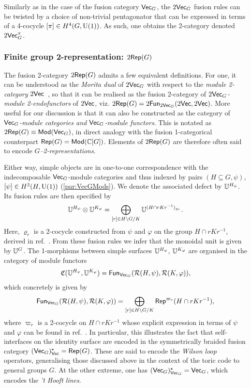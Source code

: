 Similarly as in the case of the fusion category $\mathsf{Vec}_G$, the $2\mathsf{Vec}_G$ fusion rules can be twisted by a choice of non-trivial pentagonator that can be expressed in terms of a 4-cocycle $[\pi]\in H^4(G,{\rm U}(1))$. As such, one obtains the 2-category denoted $2\mathsf{Vec}_G^\pi$.
\subsubsection{Finite group 2-representation: $2\mathsf{Rep}(G)$} The fusion 2-category $2\mathsf{Rep}(G)$ admits a few equivalent definitions. For one, it can be understood as the \emph{Morita dual} of $2\mathsf{Vec}_G$ with respect to the \emph{module 2-category} $2\mathsf{Vec}$~\cite{Delcamp2021}, so that it can be realised as the fusion 2-category of \emph{$2\mathsf{Vec}_G$-module 2-endofunctors} of $2\mathsf{Vec}$, viz. $2\mathsf{Rep}(G)=2\mathsf{Fun}_{2\mathsf{Vec}_G}(2\mathsf{Vec},2\mathsf{Vec})$. More useful for our discussion is that it can also be constructed as the category of \emph{$\mathsf{Vec}_G$-module categories and $\mathsf{Vec}_G$-module functors}. This is notated as $2\mathsf{Rep}(G)\equiv\mathsf{Mod}(\mathsf{Vec}_G)$, in direct analogy with the fusion 1-categorical counterpart $\mathsf{Rep}(G)=\mathsf{Mod}(\mathbb C[G])$. Elements of $2\mathsf{Rep}(G)$ are therefore often said to encode \emph{$G$--2-representations}.

\bigskip\noindent Either way, simple objects are in one-to-one correspondence with the indecomposable $\mathsf{Vec}_G$-module categories and thus indexed by pairs $(H\subseteq G,\psi)$, $[\psi]\in H^2(H,{\rm U}(1))$ (\cref{par:VecGMods}). We denote the associated defect by $\mathbb U^{H_\psi}$. Its fusion rules are then specified by
\begin{equation}
	\mathbb U^{H_\psi} \otimes \mathbb U^{K_\varphi} = \bigoplus_{[r]\in H\backslash G / K} \mathbb U^{(H\cap rKr^{-1})_{\varrho_r}}.
\end{equation}
Here, $\varrho_r$ is a 2-cocycle constructed from $\psi$ and $\varphi$ on the group $H\cap rKr^{-1}$, derived in ref.~\cite{Greenough2010}.  From these fusion rules we infer that the monoidal unit is given by $\mathbb U^G$. The 1-morphisms between simple surfaces $\mathbb U^{H_\psi}$, $\mathbb U^{K_\varphi}$ are organised in the category of module functors
\begin{equation}
	\mathfrak{C}(\mathbb U^{H_\psi}, \mathbb U^{K_\varphi}) = \mathsf{Fun}_{\mathsf{Vec}_G}(\mathcal{R}(H,\psi), \mathcal{R}(K,\varphi)),
\end{equation}
which concretely is given by
\begin{equation}\label{eq:2RepG1morph}
	\mathsf{Fun}_{\mathsf{Vec}_G}(\mathcal{R}(H,\psi), \mathcal{R}(K,\varphi)) = \bigoplus_{[r]\in H\backslash G / K} \mathsf{Rep}^{\varpi_r} (H\cap rKr^{-1}),
\end{equation}
where $\varpi_r$ is a 2-cocycle on $H\cap rKr^{-1}$ whose explicit expression in terms of $\psi$ and $\varphi$ can be found in ref.~\cite{Ostrik2001}. In particular, this illustrates the fact that self-interfaces on the identity surface are encoded in the symmetrically braided fusion category $(\mathsf{Vec}_G)^\star_{\mathsf{Vec}}=\mathsf{Rep}(G)$. These are said to encode the \emph{Wilson loop} operators, generalising those discussed above in the context of the toric code to general groups $G$. At the other extreme, one has $(\mathsf{Vec}_G)^\star_{\mathsf{Vec}_G}=\mathsf{Vec}_G$, which encodes the \emph{'t Hooft lines}.

